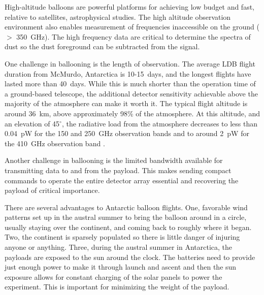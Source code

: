 
High-altitude balloons are powerful platforms for achieving low budget and fast, relative to satellites, astrophysical studies. 
The high altitude observation environment also enables measurement of frequencies inaccessible on the ground ($>$ 350~GHz). The high frequency data are critical to determine the spectra of dust so the dust foreground can be subtracted from the signal. 

One challenge in ballooning is the length of observation. 
The average \ac{LDB} flight duration from McMurdo, Antarctica is 10-15~days, and the longest flights have lasted more than 40~days.  
While this is much shorter than the operation time of a ground-based telescope, the additional detector sensitivity achievable above the majority of the atmosphere can make it worth it. 
The typical flight altitude is around 36~km, above approximately 98\% of the atmosphere. 
At this altitude, and an elevation of 45$^\circ$, the radiative load from the atmosphere decreases to less than 0.04~pW for the 150 and 250~GHz observation bands and to around 2~pW for the 410~GHz observation band \cite{Bao2015}. 

Another challenge in ballooning is the limited bandwidth available for transmitting data to and from the payload. 
This makes sending compact commands to operate the entire detector array essential and  recovering the payload of critical importance. 

There are several advantages to Antarctic balloon flights. 
One, favorable wind patterns set up in the austral summer to bring the balloon around in a circle, usually staying over the continent, and coming back to roughly where it began. 
Two, the continent is sparsely populated so there is little danger of injuring anyone or anything. 
Three, during the austral summer in Antarctica, the payloads are exposed to the sun around the clock. 
The batteries need to provide just enough power to make it through launch and ascent and then the sun exposure allows for constant charging of the solar panels to power the experiment. 
This is important for minimizing the weight of the payload. 




